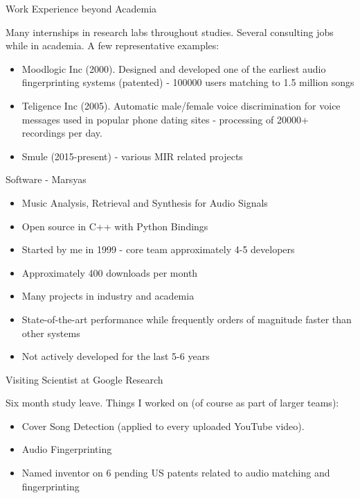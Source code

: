 \documentclass[12pt]{beamer}
\begin{document}
\begin{frame}{Work Experience beyond Academia}

  Many internships in research labs throughout studies. Several
  consulting jobs while in academia. A few representative examples:

\begin{itemize}
\item{Moodlogic Inc (2000). Designed and developed one of the earliest audio fingerprinting systems (patented) - 100000 users matching to 1.5 million songs}
\item{Teligence Inc (2005). Automatic male/female voice discrimination for voice messages used in popular phone dating sites - processing of 20000+ recordings per day.}
\item{Smule (2015-present) - various MIR related projects}
\end{itemize}
\end{frame}

\begin{frame}{Software - Marsyas} 
\begin{itemize}
\item{Music Analysis, Retrieval and Synthesis for Audio Signals} 
\item{Open source in C++ with Python Bindings} 
\item{Started by me in 1999 - core team approximately 4-5 developers}
\item{Approximately 400 downloads per month}
\item{Many projects in industry and academia} 
\item{State-of-the-art performance while frequently orders of
  magnitude faster than other systems}
\item{Not actively developed for the last 5-6 years}
\end{itemize} 
\end{frame} 

\begin{frame}{Visiting Scientist at Google Research} 

Six month study leave. Things I worked on (of course as part of larger teams):
\begin{itemize} 
\item{Cover Song Detection (applied to every uploaded YouTube video).}
\item{Audio Fingerprinting}
\item{Named inventor on 6 pending US patents related to audio matching and fingerprinting} 
\end{itemize}  
\end{frame} 
\end{document}

